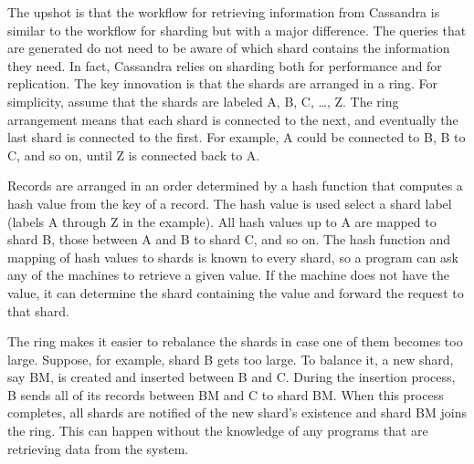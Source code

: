 The upshot is that the workflow for retrieving information from Cassandra
is similar to the workflow for sharding but with a major difference.
The queries that are generated do not need to be aware
of which shard contains the information they need.
In fact, Cassandra relies on sharding both for performance and for replication.
The key innovation is that the shards are arranged in a ring.
For simplicity, assume that the shards are labeled A, B, C, \dots, Z.
The ring arrangement means that each shard is connected to the next,
and eventually the last shard is connected to the first.
For example, A could be connected to B, B to C, and so on, until Z is connected back to A.

Records are arranged in an order determined by a hash function
that computes a hash value from the key of a record.
The hash value is used select a shard label (labels A through Z in the example).
All hash values up to A are mapped to shard B,
those between A and B to shard C, and so on.
The hash function and mapping of hash values to shards is known to every shard,
so a program can ask any of the machines to retrieve a given value.
If the machine does not have the value,
it can determine the shard containing the value
and forward the request to that shard.

The ring makes it easier to rebalance the shards
in case one of them becomes too large.
Suppose, for example, shard B gets too large.
To balance it, a new shard, say BM, is created and inserted between B and C.
During the insertion process, B sends all of its records between BM and C to shard BM.
When this process completes, all shards are notified of the new
shard's existence and shard BM joins the ring.
This can happen without the knowledge of any programs
that are retrieving data from the system.

